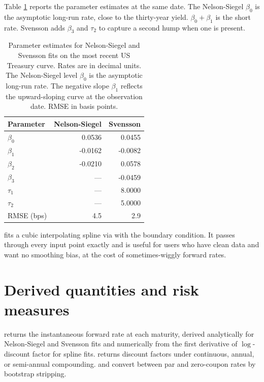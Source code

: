 Table \ref{tab:params} reports the parameter estimates at the
same date. The Nelson-Siegel \(\beta_0\) is the asymptotic long-run
rate, close to the thirty-year yield. \(\beta_0 + \beta_1\) is the
short rate. Svensson adds \(\beta_3\) and \(\tau_2\) to capture a
second hump when one is present.

\begin{table}

\caption{\label{tab:params}Parameter estimates for Nelson-Siegel and Svensson fits on the most recent US Treasury curve. Rates are in decimal units. The Nelson-Siegel level $\beta_0$ is the asymptotic long-run rate. The negative slope $\beta_1$ reflects the upward-sloping curve at the observation date. RMSE in basis points.}
\centering
\begin{tabular}[t]{lrr}
\toprule
Parameter & Nelson-Siegel & Svensson\\
\midrule
$\beta_0$ & 0.0536 & 0.0455\\
$\beta_1$ & -0.0162 & -0.0082\\
$\beta_2$ & -0.0210 & 0.0578\\
$\beta_3$ & --- & -0.0459\\
$\tau_1$ & --- & 8.0000\\
\addlinespace
$\tau_2$ & --- & 5.0000\\
RMSE (bps) & 4.5 & 2.9\\
\bottomrule
\end{tabular}
\end{table}

 fits a cubic interpolating spline via
 with the  boundary
condition. It passes through every input point exactly and is
useful for users who have clean data and want no smoothing bias,
at the cost of sometimes-wiggly forward rates.

\section{Derived quantities and risk measures}\label{derived-quantities-and-risk-measures}

 returns the instantaneous forward rate at
each maturity, derived analytically for Nelson-Siegel and Svensson
fits and numerically from the first derivative of \(\log\)-discount
factor for spline fits.  returns discount
factors under continuous, annual, or semi-annual compounding.
 and  convert
between par and zero-coupon rates by bootstrap stripping.


